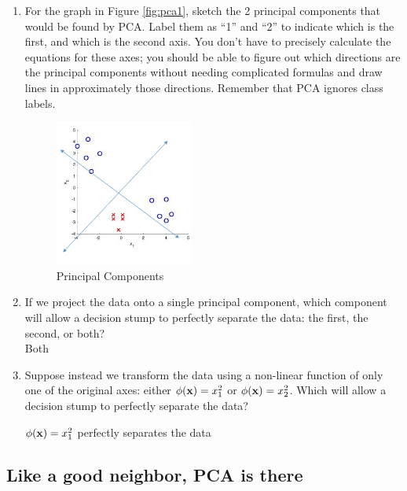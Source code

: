 \begin{enumerate}
\item {} For the graph in Figure \ref{fig:pca1}, sketch the 2
  principal components that would be found by PCA. Label them as ``1''
  and ``2'' to indicate which is the first, and which is the second
  axis.  You don't have to precisely calculate the equations for these
  axes; you should be able to figure out which directions are the
  principal components without needing complicated formulas and draw
  lines in approximately those directions.  Remember that PCA ignores
  class labels.

\begin{figure}[h!]
 \centering
 \includegraphics[width=0.43\textwidth]{images/2_1}
 \caption{Principal Components}
 \label{fig:pca3}
\end{figure}


\item {} If we project the data onto a single principal
  component, which component will allow a decision stump to perfectly
  separate the data: the first, the second, or both? \\

Both \\


\item {} Suppose instead we transform the data using a
  non-linear function of only one of the original axes: either
  $\phi(\mathbf{x}) = x_1^2$ or $\phi(\mathbf{x}) = x_2^2$. Which will allow a
  decision stump to perfectly separate the data?

 $\phi(\mathbf{x}) = x_1^2$ perfectly separates the data \\

\end{enumerate}

\subsection{Like a good neighbor, PCA is there}


